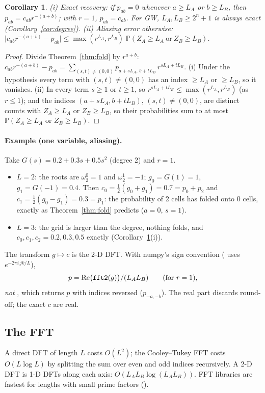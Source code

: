\documentclass[11pt]{article}
\newtheorem{corollary}[theorem]{Corollary}
\theoremstyle{definition}
\theoremstyle{remark}
\newcommand{\Prob}{\mathbb{P}}
\newcommand{\code}[1]{\texttt{\detokenize{#1}}}
\begin{document}
\begin{corollary}\label{cor:fold}
(i) \emph{Exact recovery:} if $p_{ab}=0$ whenever $a\ge L_A$ or $b\ge L_B$, then $p_{ab}=c_{ab}r^{-(a+b)}$; with $r=1$, $p_{ab}=c_{ab}$. For GW, $L_A,L_B\ge2^n+1$ is always exact (Corollary~\ref{cor:degree}).
(ii) \emph{Aliasing error} otherwise: $\big|c_{ab}r^{-(a+b)}-p_{ab}\big|\le\max(r^{L_A},r^{L_B})\;\Prob(Z_A\ge L_A\ \text{or}\ Z_B\ge L_B)$.
\end{corollary}
\begin{proof}
Divide Theorem~\ref{thm:fold} by $r^{a+b}$: $c_{ab}r^{-(a+b)}-p_{ab}=\sum_{(s,t)\ne(0,0)}p_{a+sL_A,\,b+tL_B}\,r^{sL_A+tL_B}$. (i) Under the hypothesis every term with $(s,t)\ne(0,0)$ has an index $\ge L_A$ or $\ge L_B$, so it vanishes. (ii) In every term $s\ge1$ or $t\ge1$, so $r^{sL_A+tL_B}\le\max(r^{L_A},r^{L_B})$ (as $r\le1$); and the indices $(a+sL_A,b+tL_B)$, $(s,t)\ne(0,0)$, are distinct counts with $Z_A\ge L_A$ or $Z_B\ge L_B$, so their probabilities sum to at most $\Prob(Z_A\ge L_A\text{ or }Z_B\ge L_B)$.
\end{proof}

\paragraph{Example (one variable, aliasing).} Take $G(s)=0.2+0.3s+0.5s^2$ (degree 2) and $r=1$.
\begin{itemize}
\item $L=2$: the roots are $\omega_2^0=1$ and $\omega_2^1=-1$; $g_0=G(1)=1$, $g_1=G(-1)=0.4$. Then $c_0=\tfrac12(g_0+g_1)=0.7=p_0+p_2$ and $c_1=\tfrac12(g_0-g_1)=0.3=p_1$: the probability of 2 cells has folded onto 0 cells, exactly as Theorem~\ref{thm:fold} predicts ($a=0$, $s=1$).
\item $L=3$: the grid is larger than the degree, nothing folds, and $c_0,c_1,c_2=0.2,0.3,0.5$ exactly (Corollary~\ref{cor:fold}(i)).
\end{itemize}
The transform $g\mapsto c$ is the 2-D DFT. With numpy's sign convention (\code{fft} uses $e^{-2\pi i\,jk/L}$),
\[
p=\mathrm{Re}\big(\code{fft2}(g)\big)/(L_AL_B)\qquad(\text{for }r=1),
\]
\emph{not} \code{ifft2}, which returns $p$ with indices reversed ($p_{-a,-b}$). The real part discards round-off; the exact $c$ are real.

\subsection{The FFT}
A direct DFT of length $L$ costs $O(L^2)$; the Cooley--Tukey FFT costs $O(L\log L)$ by splitting the sum over even and odd indices recursively. A 2-D DFT is 1-D DFTs along each axis: $O(L_AL_B\log(L_AL_B))$. FFT libraries are fastest for lengths with small prime factors (\code{scipy.fft.next_fast_len}).
\end{document}
